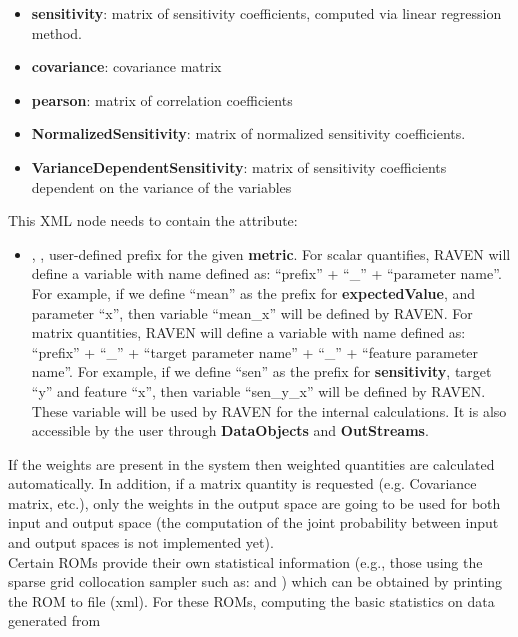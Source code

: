 \begin{itemize}
\begin{itemize}
    \item \textbf{sensitivity}: matrix of sensitivity coefficients, computed via linear regression method.
    \item \textbf{covariance}: covariance matrix
    \item \textbf{pearson}: matrix of correlation coefficients
    \item \textbf{NormalizedSensitivity}: matrix of normalized sensitivity
    coefficients. 
    \item \textbf{VarianceDependentSensitivity}: matrix of sensitivity coefficients dependent on the variance of the variables
  \end{itemize}
  This XML node needs to contain the attribute:
  \begin{itemize}
    \itemsep0em
    \item {}, , user-defined prefix for the given \textbf{metric}.
      For scalar quantifies, RAVEN will define a variable with name defined as:  ``prefix'' + ``\_'' + ``parameter name''.
      For example, if we define ``mean'' as the prefix for \textbf{expectedValue}, and parameter ``x'', then variable
      ``mean\_x'' will be defined by RAVEN.
      For matrix quantities, RAVEN will define a variable with name defined as: ``prefix'' + ``\_'' + ``target parameter name'' + ``\_'' + ``feature parameter name''.
      For example, if we define ``sen'' as the prefix for \textbf{sensitivity}, target ``y'' and feature ``x'', then
      variable ``sen\_y\_x'' will be defined by RAVEN.
      \nb These variable will be used by RAVEN for the internal calculations. It is also accessible by the user through
      \textbf{DataObjects} and \textbf{OutStreams}.
  \end{itemize}
  \nb If the weights are present in the system then weighted quantities are calculated automatically. In addition, if a matrix quantity is requested (e.g. Covariance matrix, etc.), only the weights in the output space are going to be used for both input and output space (the computation of the joint probability between input and output spaces is not implemented yet).
  \\
  \nb Certain ROMs provide their own statistical information (e.g., those using
  the sparse grid collocation sampler such as: 
  and ) which can be obtained by printing the ROM to file
  (xml). For these ROMs, computing the basic statistics on data generated from

\end{itemize}
